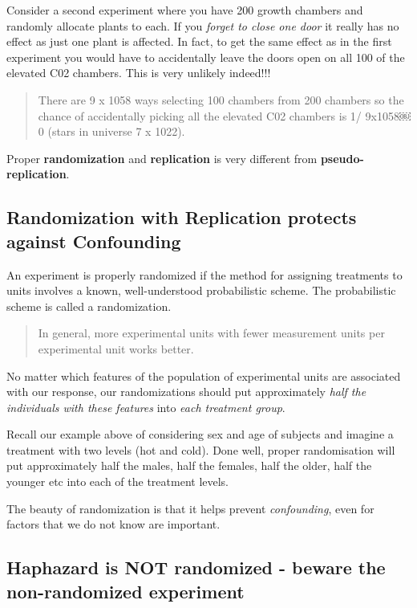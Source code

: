 \documentclass[
]{book}
\begin{document}
Consider a second experiment where you have 200 growth chambers and randomly allocate plants to each. If you \emph{forget to close one door} it really has no effect as just one plant is affected. In fact, to get the same effect as in the first experiment you would have to accidentally leave the doors open on all 100 of the elevated C02 chambers. This is very unlikely indeed!!!

\begin{quote}
There are 9 x 1058 ways selecting 100 chambers from 200 chambers so the chance of accidentally picking all the elevated C02 chambers is 1/ 9x1058￼0 (stars in universe 7 x 1022).
\end{quote}

Proper \textbf{randomization} and \textbf{replication} is very different from \textbf{pseudo-replication}.

\subsection{Randomization with Replication protects against Confounding}\label{randomization-with-replication-protects-against-confounding}

An experiment is properly randomized if the method for assigning treatments to units involves a known, well-understood probabilistic scheme. The probabilistic scheme is called a randomization.

\begin{quote}
In general, more experimental units with fewer measurement units per experimental unit works better.
\end{quote}

No matter which features of the population of experimental units are associated with our response, our randomizations should put approximately \emph{half the individuals with these features} into \emph{each treatment group}.

Recall our example above of considering sex and age of subjects and imagine a treatment with two levels (hot and cold). Done well, proper randomisation will put approximately half the males, half the females, half the older, half the younger etc into each of the treatment levels.

The beauty of randomization is that it helps prevent \emph{confounding}, even for factors that we do not know are important.

\subsection{\texorpdfstring{\textbf{Haphazard} is NOT randomized - beware the non-randomized experiment}{Haphazard is NOT randomized - beware the non-randomized experiment}}\label{haphazard-is-not-randomized---beware-the-non-randomized-experiment}
\end{document}
